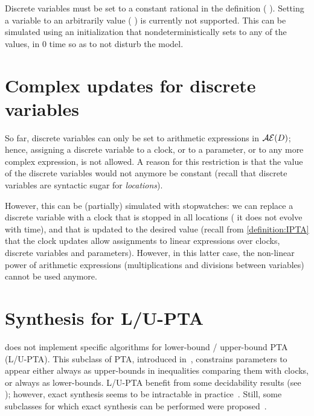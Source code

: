 Discrete variables must be set to a constant rational in the  definition (\eg{} ).
Setting a variable to an arbitrarily value (\eg{} ) is currently not supported.
This can be simulated using an initialization \IPTA{} that nondeterministically sets  to any of the values, in 0 time so as to not disturb the model.


\section{Complex updates for discrete variables}

So far, discrete variables can only be set to arithmetic expressions in $\mathcal{AE}(D)$;
hence, assigning a discrete variable to a clock, or to a parameter, or to any more complex expression, is not allowed.
A reason for this restriction is that the value of the discrete variables would not anymore be constant (recall that discrete variables are syntactic sugar for \emph{locations}).

However, this can be (partially) simulated with stopwatches: we can replace a discrete variable with a clock that is stopped in all locations (\ie{} it does not evolve with time), and that is updated to the desired value (recall from \cref{definition:IPTA} that the clock updates allow assignments to linear expressions over clocks, discrete variables and parameters).
However, in this latter case, the non-linear power of arithmetic expressions (multiplications and divisions between variables) cannot be used anymore.



\section{Synthesis for L/U-PTA}

\imitator{} does not implement specific algorithms for lower-bound / upper-bound PTA (L/U-PTA).
This subclass of PTA, introduced in~\cite{HRSV02}, constrains parameters to appear either always as upper-bounds in inequalities comparing them with clocks, or always as lower-bounds.
L/U-PTA benefit from some decidability results (see \eg{} \cite{HRSV02,BlT09,JLR15,AM15,ALime17}); however, exact synthesis seems to be intractable in practice~\cite{JLR15,ALR16decision}.
Still, some subclasses for which exact synthesis can be performed were proposed~\cite{BlT09,ALR18FORMATS}.

